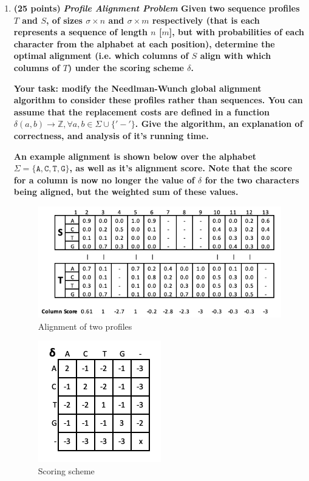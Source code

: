 \documentclass[11pt, oneside]{article}   	%
\begin{document}
\begin{enumerate}
\item \textbf{(25 points)} 
\textbf{\emph{Profile Alignment Problem} Given two sequence profiles $T$ and $S$,  of sizes $\sigma \times n$ and $\sigma \times m$ respectively 
(that is each represents a sequence of length $n$ [$m$], but with probabilities of each character from the alphabet at each position), 
determine the optimal alignment (i.e. which columns of $S$ align with which columns of $T$) under the scoring scheme $\delta$.}

\textbf{Your task: \textbf{modify} the Needlman-Wunch global alignment algorithm to consider these profiles rather than sequences. 
You can assume that the replacement costs are defined in a function $\delta(a,b) \rightarrow \mathbb{Z} , \forall a,b \in \Sigma \cup \{'-'\}$.
Give the algorithm, an explanation of correctness, and analysis of it's running time. }

\textbf{An example alignment is shown below over the alphabet $\Sigma=\{\texttt{A},\texttt{C},\texttt{T},\texttt{G}\}$, as well as it's alignment score. 
Note that the score for a column is now no longer the value of $\delta$ for the two characters being aligned, but the weighted sum of these values.}


\begin{figure}[h!] %
\begin{centering}
\includegraphics{HW3_Align}
\caption{Alignment of two profiles}
\end{centering}
\end{figure}

\begin{figure}[h!]
\begin{centering}
\includegraphics{HW3_Delta}
\caption{Scoring scheme}
\end{centering}
\end{figure}


\end{enumerate}
\end{document}
